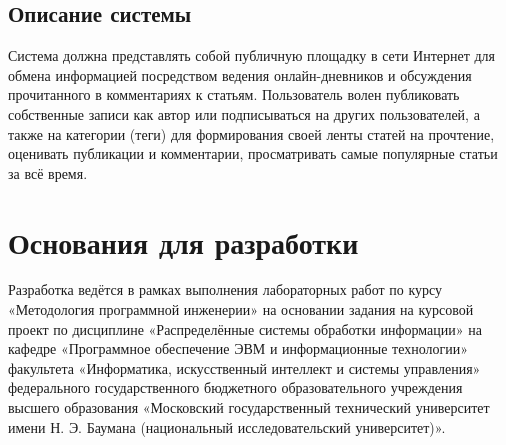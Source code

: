 \documentclass{bmstu-gost-7-32}
\begin{document}
\subsection*{Описание системы}

Система должна представлять собой публичную площадку в сети Интернет для обмена информацией посредством ведения онлайн-дневников и обсуждения прочитанного в комментариях к статьям.
Пользователь волен публиковать собственные записи как автор или подписываться на других пользователей, а также на категории (теги) для формирования своей ленты статей на прочтение, оценивать публикации и комментарии, просматривать самые популярные статьи за всё время.


\section{Основания для разработки}



Разработка ведётся в рамках выполнения лабораторных работ по курсу «Методология программной инженерии» на основании задания на курсовой проект по дисциплине «Распределённые системы обработки информации» на кафедре «Программное обеспечение ЭВМ и информационные технологии» факультета «Информатика, искусственный интеллект и системы управления» федерального государственного бюджетного образовательного учреждения высшего образования «Московский государственный технический университет имени Н. Э. Баумана (национальный исследовательский университет)».
\end{document}
